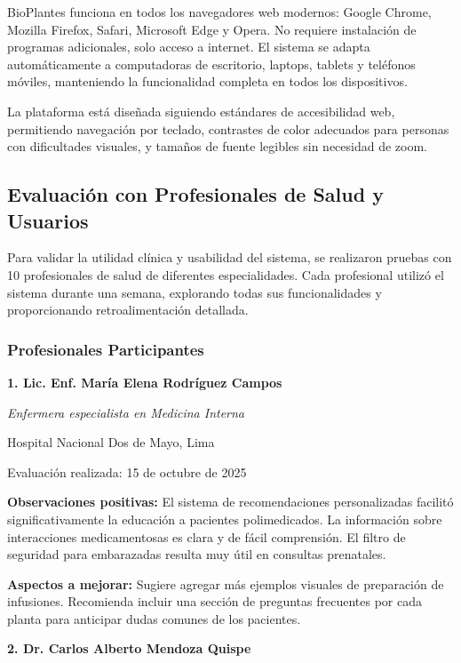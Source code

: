 \documentclass[12pt,a4paper]{article}
\begin{document}
BioPlantes funciona en todos los navegadores web modernos: Google Chrome, Mozilla Firefox, Safari, Microsoft Edge y Opera. No requiere instalación de programas adicionales, solo acceso a internet. El sistema se adapta automáticamente a computadoras de escritorio, laptops, tablets y teléfonos móviles, manteniendo la funcionalidad completa en todos los dispositivos.

La plataforma está diseñada siguiendo estándares de accesibilidad web, permitiendo navegación por teclado, contrastes de color adecuados para personas con dificultades visuales, y tamaños de fuente legibles sin necesidad de zoom.

\subsection{Evaluación con Profesionales de Salud y Usuarios}

Para validar la utilidad clínica y usabilidad del sistema, se realizaron pruebas con 10 profesionales de salud de diferentes especialidades. Cada profesional utilizó el sistema durante una semana, explorando todas sus funcionalidades y proporcionando retroalimentación detallada.

\subsubsection{Profesionales Participantes}

\textbf{1. Lic. Enf. María Elena Rodríguez Campos}

\textit{Enfermera especialista en Medicina Interna}

Hospital Nacional Dos de Mayo, Lima

Evaluación realizada: 15 de octubre de 2025

\textbf{Observaciones positivas:} El sistema de recomendaciones personalizadas facilitó significativamente la educación a pacientes polimedicados. La información sobre interacciones medicamentosas es clara y de fácil comprensión. El filtro de seguridad para embarazadas resulta muy útil en consultas prenatales.

\textbf{Aspectos a mejorar:} Sugiere agregar más ejemplos visuales de preparación de infusiones. Recomienda incluir una sección de preguntas frecuentes por cada planta para anticipar dudas comunes de los pacientes.

\vspace{0.3cm}

\textbf{2. Dr. Carlos Alberto Mendoza Quispe}
\end{document}
